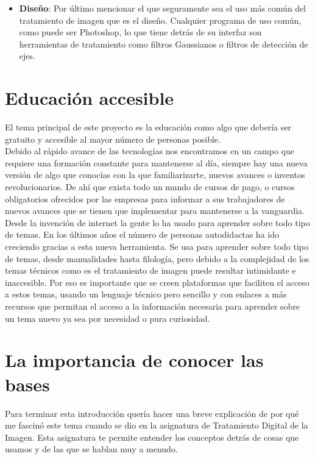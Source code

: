 \begin{itemize}
\item \textbf{Diseño}: Por último mencionar el que seguramente sea el uso más común del tratamiento de imagen que es el diseño. Cualquier programa de uso común, como puede ser Photoshop, lo que tiene detrás de su interfaz son herramientas de tratamiento como filtros Gaussianos o filtros de detección de ejes.\\

\end{itemize}

\section{Educación accesible}

El tema principal de este proyecto es la educación como algo que debería ser gratuito y accesible al mayor número de personas posible.\\

Debido al rápido avance de las tecnologías nos encontramos en un campo que requiere una formación constante para mantenerse al día, siempre hay una nueva versión de algo que conocías con la que familiarizarte, nuevos avances o inventos revolucionarios. De ahí que exista todo un mundo de cursos de pago, o cursos obligatorios ofrecidos por las empresas para informar a sus trabajadores de nuevos avances que se tienen que implementar para mantenerse a la vanguardia.\\

Desde la invención de internet la gente lo ha usado para aprender sobre todo tipo de temas\cite{KUO201435}. En los últimos años el número de personas autodidactas ha ido creciendo gracias a esta nueva herramienta. Se usa para aprender sobre todo tipo de temas, desde manualidades hasta filología, pero debido a la complejidad de los temas técnicos como es el tratamiento de imagen puede resultar intimidante e inaccesible. Por eso es importante que se creen plataformas que faciliten el acceso a estos temas, usando un lenguaje técnico pero sencillo y con enlaces a más recursos que permitan el acceso a la información necesaria para aprender sobre un tema nuevo ya sea por necesidad o pura curiosidad.\\

\section{La importancia de conocer las bases}

Para terminar esta introducción quería hacer una breve explicación de por qué me fascinó este tema cuando se dio en la asignatura de Tratamiento Digital de la Imagen. Esta asignatura te permite entender los conceptos detrás de cosas que usamos y de las que se hablan muy a menudo.\\

